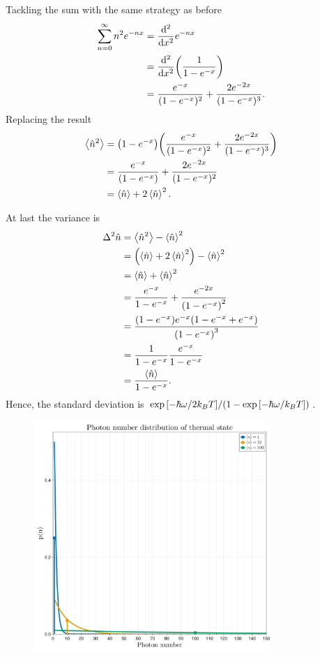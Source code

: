 \documentclass[../main.tex]{subfiles}
\begin{document}
Tackling the sum with the same strategy as before
\begin{align*}
    \sum_{n=0}^\infty n^2e^{-nx} &= \dv[2]{x}e^{-nx} \\
                                 &= \dv[2]{x}\qty(\frac{1}{1-e^{-x}}) \\
                                 &= \frac{e^{-x}}{(1-e^{-x})^2}+\frac{2e^{-2x}}{(1-e^{-x})^3}.
\end{align*}
Replacing the result
\begin{align*}
    \expval{\hat{n}^2}  &= \qty(1-e^{-x})\qty(\frac{e^{-x}}{(1-e^{-x})^2}+\frac{2e^{-2x}}{(1-e^{-x})^3}) \\
                        &= \frac{e^{-x}}{(1-e^{-x})}+\frac{2e^{-2x}}{(1-e^{-x})^2} \\
                        &= \expval{\hat{n}} + 2\expval{\hat{n}}^2.
\end{align*}

At last the variance is
\begin{align*}
    \Delta^2\hat{n} &= \expval{\hat{n}^2} - \expval{\hat{n}}^2 \\
                    &= \qty(\expval{\hat{n}} + 2\expval{\hat{n}}^2) - \expval{\hat{n}}^2 \\
                    &= \expval{\hat{n}} + \expval{\hat{n}}^2 \\
                    &= \frac{e^{-x}}{1-e^{-x}} + \frac{e^{-2x}}{\qty(1-e^{-x})^2} \\
                    &= \frac{\qty(1-e^{-x})e^{-x}\qty(1-e^{-x} + e^{-x})}{\qty(1-e^{-x})^3} \\
                    &= \frac{1}{1-e^{-x}}\frac{e^{-x}}{1-e^{-x}} \\
                    &= \frac{\expval{\hat{n}}}{1-e^{-x}}.
\end{align*}
Hence, the standard deviation is $\exp\qty[-\hbar\omega/2k_BT]/(1-\exp\qty[-\hbar\omega/k_BT])$.

\begin{figure}[ht!]
    \centering
    \includegraphics[width=0.8\textwidth]{imgs/fig_thermal.png}
\end{figure}
\end{document}
